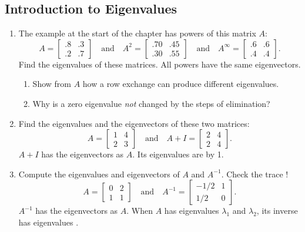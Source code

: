 \documentclass[14pt, a4paper]{article}
\begin{document}
\subsection{Introduction to Eigenvalues}
\begin{enumerate}
    \item The example at the start of the chapter has powers of this matrix $A$:
          \[
              A = \begin{bmatrix} .8 & .3 \\ .2 & .7 \end{bmatrix} \quad \text{and} \quad
              A^2 = \begin{bmatrix} .70 & .45 \\ .30 & .55 \end{bmatrix} \quad \text{and} \quad
              A^{\infty} = \begin{bmatrix} .6 & .6 \\ .4 & .4 \end{bmatrix} .
          \]
          Find the eigenvalues of these matrices. All powers have the same eigenvectors.
          \begin{enumerate}
              \item Show from $A$ how a row exchange can produce different eigenvalues.
              \item Why is a zero eigenvalue \textit{not} changed by the steps of elimination?
          \end{enumerate}

    \item Find the eigenvalues and the eigenvectors of these two matrices:
          \[
              A = \begin{bmatrix} 1 & 4 \\ 2 & 3 \end{bmatrix} \quad \text{and} \quad
              A + I = \begin{bmatrix} 2 & 4 \\ 2 & 4 \end{bmatrix} .
          \]
          $A + I$ has the \underline{\hspace{1cm}} eigenvectors as $A$. Its eigenvalues are \underline{\hspace{1cm}} by 1.

    \item Compute the eigenvalues and eigenvectors of $A$ and $A^{-1}$. Check the trace !
          \[
              A = \begin{bmatrix} 0 & 2 \\ 1 & 1 \end{bmatrix} \quad \text{and} \quad
              A^{-1} = \begin{bmatrix} -1/2 & 1 \\ 1/2 & 0 \end{bmatrix} .
          \]
          $A^{-1}$ has the \underline{\hspace{1cm}} eigenvectors as $A$. When $A$ has eigenvalues $\lambda_1$ and $\lambda_2$, its inverse has eigenvalues \underline{\hspace{1.5cm}} .


\end{enumerate}
\end{document}
